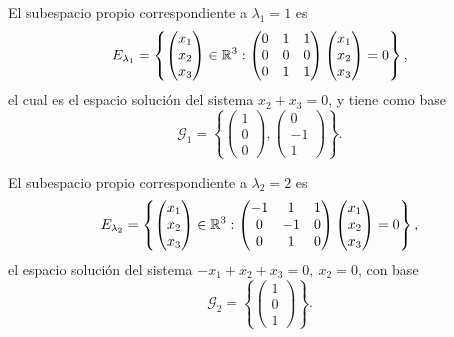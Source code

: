 \documentclass[12pt,a4paper]{book}
\begin{document}
\begin{ejemplo}
        El subespacio propio correspondiente a $\lambda_1=1$ es
        \begin{equation*}
            E_{\lambda_1}=\left\{\begin{pmatrix}x_1\\x_2\\x_3\end{pmatrix}\in\mathbb{R}^3: \begin{pmatrix}0&1&1\\0&0&0\\0&1&1\end{pmatrix}\begin{pmatrix}x_1\\x_2\\x_3\end{pmatrix}=0\right\},
        \end{equation*}
        el cual es el espacio solución del sistema $x_2+x_3=0$, y tiene como base
        \begin{equation*}
            \mathcal{G}_1=\left\{\begin{pmatrix}1\\0\\0\end{pmatrix}, \begin{pmatrix}0\\-1\\1\end{pmatrix}\right\}.
        \end{equation*}

        El subespacio propio correspondiente a $\lambda_2=2$ es
        \begin{equation*}
            E_{\lambda_2}=\left\{\begin{pmatrix}x_1\\x_2\\x_3\end{pmatrix}\in\mathbb{R}^3: \begin{pmatrix}-1&1&1\\0&-1&0\\0&1&0\end{pmatrix}\begin{pmatrix}x_1\\x_2\\x_3\end{pmatrix}=0\right\},
        \end{equation*}
        el espacio solución del sistema $-x_1+x_2+x_3=0,\ x_2=0$, con base
        \begin{equation*}
            \mathcal{G}_2=\left\{\begin{pmatrix}1\\0\\1\end{pmatrix}\right\}.
        \end{equation*}


\end{ejemplo}
\end{document}
